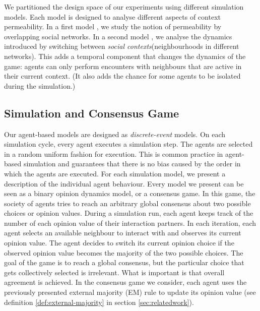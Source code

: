\documentclass[preprint,number]{elsarticle}
\begin{document}
	We partitioned the design space of our experiments using different simulation models. Each
        model is designed to analyse different aspects of context permeability. In a first model
        \cite{Antunes2007, Antunes2010}, we study the notion of permeability by overlapping social
        networks. In a second model \cite{Antunes2009}, we analyse the dynamics introduced by
        switching between \textit{social contexts}(neighbourhoods in different networks). This adds
        a temporal component that changes the dynamics of the game: agents can only perform
        encounters with neighbours that are active in their current context. (It also adds the
        chance for some agents to be isolated during the simulation.)
	
	\subsection{Simulation and Consensus Game}
	\label{sec:sim_consensus}
        \noindent Our agent-based models are designed as \textit{discrete-event} models. On each
        simulation cycle, every agent executes a simulation step. The agents are selected in a
        random uniform fashion for execution. This is common practice in agent-based simulation and
        guarantees that there is no bias caused by the order in which the agents are executed. For
        each simulation model, we present a description of the individual agent behaviour. Every
        model we present can be seen as a binary opinion dynamics model, or a consensus game. In
        this game, the society of agents tries to reach an arbitrary global consensus about two
        possible choices or opinion values. During a simulation run, each agent keeps track of the
        number of each opinion value of their interaction partners. In each iteration, each agent
        selects an available neighbour to interact with and observes its current opinion value. The
        agent decides to switch its current opinion choice if the observed opinion value becomes the
        majority of the two possible choices. The goal of the game is to reach a global consensus,
        but the particular choice that gets collectively selected is irrelevant. What is important
        is that overall agreement is achieved. In the consensus game we consider, each agent uses
        the previously presented external majority (EM) rule to update its opinion value (see
        definition \ref{def:external-majority} in section \ref{sec:relatedwork}).
	
\end{document}
